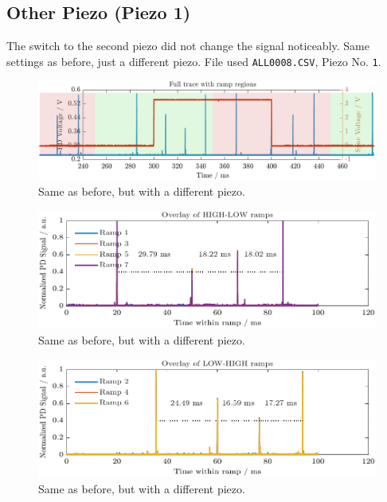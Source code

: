 \documentclass[a4paper,11pt]{article}
\begin{document}
\subsection{Other Piezo (Piezo 1)}
The switch to the second piezo did not change the signal noticeably.
Same settings as before, just a different piezo. File used \texttt{ALL0008.CSV}, Piezo No. \texttt{1}.
\begin{figure}[H]
    \centering
    \includegraphics[width=\textwidth]{ManyRamp/Zoomed_Ramp2.pdf}
    \caption{Same as before, but with a different piezo.}
\end{figure}


\begin{figure}[H]
    \centering
    \includegraphics[width=\textwidth]{ManyRamp/HiLo2.pdf}
    \caption{Same as before, but with a different piezo.}
\end{figure}

\begin{figure}[H]
    \centering
    \includegraphics[width=\textwidth]{ManyRamp/LoHi2.pdf}
    \caption{Same as before, but with a different piezo.}
\end{figure}


\newpage
\end{document}
